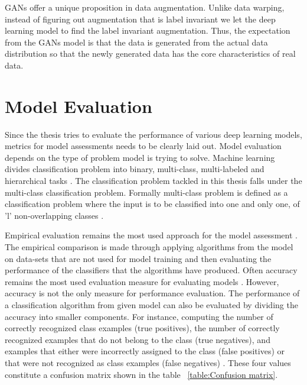 GANs offer a unique proposition in data augmentation. Unlike data warping, instead of figuring out augmentation that is label invariant we let the deep learning model to find the label invariant augmentation. Thus, the expectation from the GANs model is that the data is generated from the actual data distribution so that the newly generated data has the core characteristics of real data.   

\section{Model Evaluation}

Since the thesis tries to evaluate the performance of various deep learning models, metrics for model assessments needs to be clearly laid out. Model evaluation depends on the type of problem model is trying to solve. Machine learning divides classification problem into binary, multi-class, multi-labeled and hierarchical tasks \citep{sokolova2009systematic}. The classification problem tackled in this thesis falls under the multi-class classification problem. Formally multi-class problem is defined as a classification problem where the input is to be classified into one and only one, of 'l' non-overlapping classes \citep{sokolova2009systematic}.

Empirical evaluation remains the most used approach for the model assessment \citep{sokolova2009systematic}. The empirical comparison is made through applying algorithms from the model on data-sets that are not used for model training and then evaluating the performance of the classifiers that the algorithms have produced. Often accuracy remains the most used evaluation measure for evaluating models \citep{sokolova2009systematic}. However, accuracy is not the only measure for performance evaluation. The performance of a classification algorithm from given model can also be evaluated by dividing the accuracy into smaller components. For instance, computing the number of correctly recognized class examples (true positives), the number of correctly recognized examples that do not belong to the class (true negatives), and examples that either were incorrectly assigned to the class (false positives) or that were not recognized as class examples (false negatives) \citep{sokolova2009systematic}. These four values constitute a confusion matrix shown in the table ~\ref{table:Confusion matrix}.



